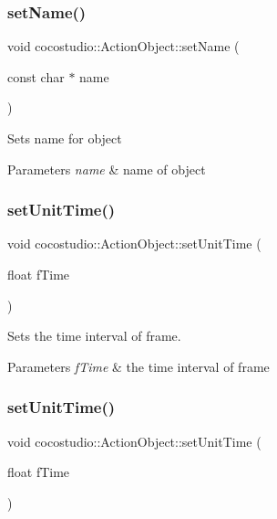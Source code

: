 \subsubsection{\texorpdfstring{set\+Name()}{setName()}\hspace{0.1cm}{\footnotesize\ttfamily [2/2]}}
{\footnotesize\ttfamily void cocostudio\+::\+Action\+Object\+::set\+Name (\begin{DoxyParamCaption}\item[{const char $\ast$}]{name }\end{DoxyParamCaption})}

Sets name for object


\begin{DoxyParams}{Parameters}
{\em name} & name of object \\
\hline
\end{DoxyParams}
\mbox{\label{classcocostudio_1_1ActionObject_acc4551d83f908653f207de243da3dde3}} 
\subsubsection{\texorpdfstring{set\+Unit\+Time()}{setUnitTime()}\hspace{0.1cm}{\footnotesize\ttfamily [1/2]}}
{\footnotesize\ttfamily void cocostudio\+::\+Action\+Object\+::set\+Unit\+Time (\begin{DoxyParamCaption}\item[{float}]{f\+Time }\end{DoxyParamCaption})}

Sets the time interval of frame.


\begin{DoxyParams}{Parameters}
{\em f\+Time} & the time interval of frame \\
\hline
\end{DoxyParams}
\mbox{\label{classcocostudio_1_1ActionObject_acc4551d83f908653f207de243da3dde3}} 
\subsubsection{\texorpdfstring{set\+Unit\+Time()}{setUnitTime()}\hspace{0.1cm}{\footnotesize\ttfamily [2/2]}}
{\footnotesize\ttfamily void cocostudio\+::\+Action\+Object\+::set\+Unit\+Time (\begin{DoxyParamCaption}\item[{float}]{f\+Time }\end{DoxyParamCaption})}


